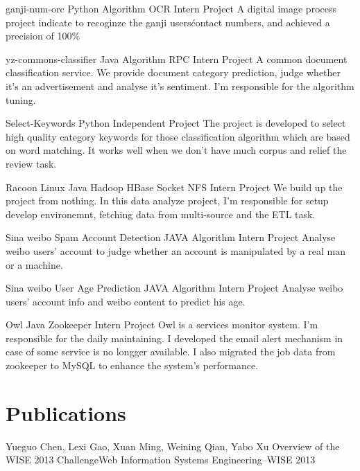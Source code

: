 \documentclass[11pt,a4paper]{moderncv}
\begin{document}
\vspace*{0.2\baselineskip}
{ganji-num-orc}
{Python Algorithm OCR}
{Intern Project}{}
{A digital image process project indicate to recoginze the ganji users\' contact numbers, and achieved a precision of 100\%}

\vspace*{0.2\baselineskip}
{yz-commons-classifier}
{Java Algorithm RPC}
{Intern Project}{}
{A common document classification service. We provide document category prediction, judge whether it's an advertisement and analyse it's sentiment. I'm responsible for the algorithm tuning.}

\vspace*{0.2\baselineskip}
{Select-Keywords}
{Python}
{Independent Project}{}
{The project is developed to select high quality category keywords for those classification algorithm which are based on word matching. It works well when we don't have much corpus and relief the review task.}

\vspace*{0.2\baselineskip}
{Racoon}
{Linux Java Hadoop HBase Socket NFS}
{Intern Project}{}
{We build up the project from nothing. In this data analyze project, I'm responsible for setup develop environemnt, fetching data from multi-source and the ETL task.}

\vspace*{0.2\baselineskip}
{Sina weibo Spam Account Detection}
{JAVA Algorithm}
{Intern Project}{}
{Analyse weibo users' account to judge whether an account is manipulated by a real man or a machine.}

\vspace*{0.2\baselineskip}
{Sina weibo User Age Prediction}
{JAVA Algorithm}
{Intern Project}{}
{Analyse weibo users' account info and weibo content to predict his age.}

\vspace*{0.2\baselineskip}
{Owl}
{Java Zookeeper}
{Intern Project}{}
{Owl is a services monitor system. I'm responsible for the daily maintaining. I developed the email alert mechanism in case of some service is no longger available. I also migrated the job data from zookeeper to MySQL to enhance the system's performance.}

\renewcommand{\baselinestretch}{1.0}

\section{Publications}
{\textnormal{Yueguo Chen, Lexi Gao, }Xuan Ming\textnormal{, Weining Qian, Yabo Xu}}
{Overview of the WISE 2013 Challenge}{Web Information Systems Engineering–WISE 2013}
{}{}{}
\end{document}
